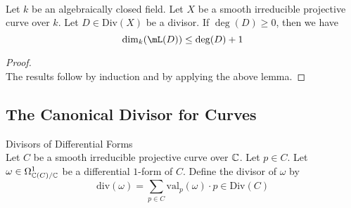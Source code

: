 \documentclass[a4paper]{article}
\begin{document}
\begin{prp}{}{}\\
Let $k$ be an algebraically closed field. Let $X$ be a smooth irreducible projective curve over $k$. Let $D\in\text{Div}(X)$ be a divisor. If $\deg(D)\geq 0$, then we have $$\dim_k(\mL(D))\leq\deg(D)+1$$
\begin{proof}\\
The results follow by induction and by applying the above lemma. 
\end{proof}
\end{prp}

\subsection{The Canonical Divisor for Curves}
\begin{defn}{Divisors of Differential Forms}{}\\
Let $C$ be a smooth irreducible projective curve over $\mathbb{C}$. Let $p\in C$. Let $\omega\in\Omega_{\mathbb{C}(C)/\mathbb{C}}^1$ be a differential $1$-form of $C$. Define the divisor of $\omega$ by $$\text{div}(\omega)=\sum_{p\in C}\text{val}_p(\omega)\cdot p\in\text{Div}(C)$$
\end{defn}
\end{document}
